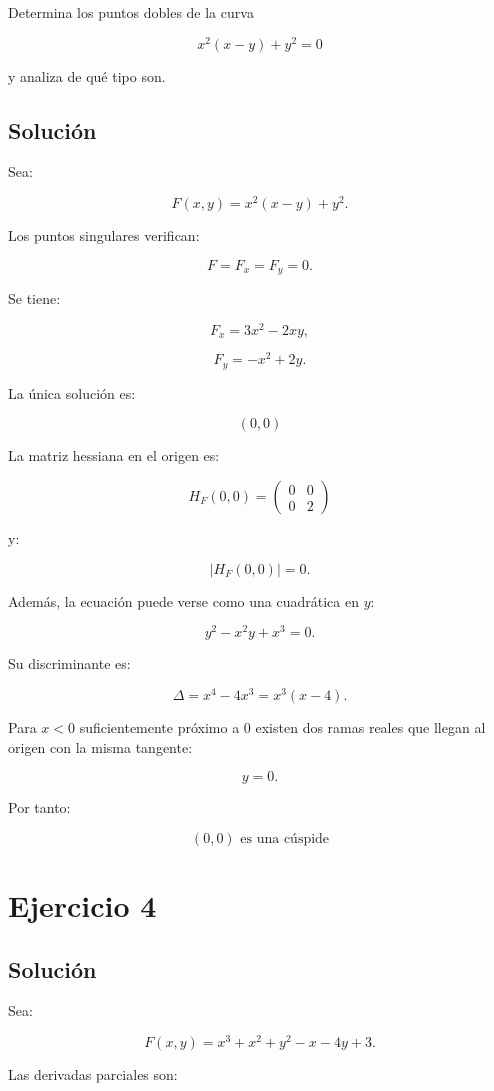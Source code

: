 \documentclass[11pt,a4paper]{article}
\begin{document}
Determina los puntos dobles de la curva

\[
x^2(x-y)+y^2=0
\]

y analiza de qué tipo son.

\subsection{Solución}

Sea:

\[
F(x,y)=x^2(x-y)+y^2.
\]

Los puntos singulares verifican:

\[
F=F_x=F_y=0.
\]

Se tiene:

\[
F_x=3x^2-2xy,
\]

\[
F_y=-x^2+2y.
\]

La única solución es:

\[
\boxed{(0,0)}
\]

La matriz hessiana en el origen es:

\[
H_F(0,0)
=
\begin{pmatrix}
0&0\\
0&2
\end{pmatrix}
\]

y:

\[
|H_F(0,0)|=0.
\]

Además, la ecuación puede verse como una cuadrática en \(y\):

\[
y^2-x^2y+x^3=0.
\]

Su discriminante es:

\[
\Delta
=
x^4-4x^3
=
x^3(x-4).
\]

Para \(x<0\) suficientemente próximo a \(0\) existen dos ramas reales que llegan al origen con la misma tangente:

\[
y=0.
\]

Por tanto:

\[
\boxed{
(0,0)\text{ es una cúspide}
}
\]

\section{Ejercicio 4}
\subsection{Solución}

Sea:

\[
F(x,y)
=
x^3+x^2+y^2-x-4y+3.
\]

Las derivadas parciales son:
\end{document}
